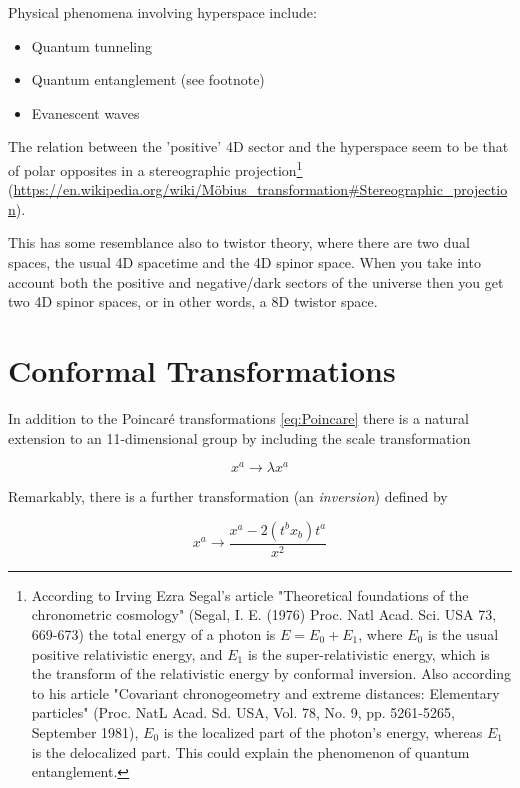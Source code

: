 Physical phenomena involving hyperspace include:

\begin{itemize}
	\item Quantum tunneling
	\item Quantum entanglement (see footnote)
	\item Evanescent waves
\end{itemize}

The relation between the 'positive' 4D sector and the hyperspace seem to be that of polar opposites in a stereographic projection\footnote{According to Irving Ezra Segal's article "Theoretical foundations of the chronometric cosmology" (Segal, I. E. (1976) Proc. Natl Acad. Sci. USA 73, 669-673) the total energy of a photon is $E=E_0+E_1$, where $E_0$ is the usual positive relativistic energy, and $E_1$ is the super-relativistic energy, which is the transform of the relativistic energy by conformal inversion. Also according to his article "Covariant chronogeometry and extreme distances: Elementary particles" (Proc. NatL Acad. Sd. USA, Vol. 78, No. 9, pp. 5261-5265, September 1981), $E_0$ is the localized part of the photon's energy, whereas $E_1$ is the delocalized part. This could explain the phenomenon of quantum entanglement.} \\
(\href{https://en.wikipedia.org/wiki/M%C3%B6bius_transformation#Stereographic_projection}{https://en.wikipedia.org/wiki/M\"{o}bius\_transformation\#Stereographic\_projection}).

This has some resemblance also to twistor theory, where there are two dual spaces, the usual 4D spacetime and the 4D spinor space. When you take into account both the positive and negative/dark sectors of the universe then you get two 4D spinor spaces, or in other words, a 8D twistor space.

\section{Conformal Transformations}

In addition to the Poincaré transformations \ref{eq:Poincare} there is a natural extension to an 11-dimensional group by including the scale transformation

\[
x^a \rightarrow \lambda x^a
\]

Remarkably, there is a further transformation (an \emph{inversion}) defined by

\[
x^a \rightarrow \frac{x^a - 2(t^b x_b) t^a}{x^2}
\]

